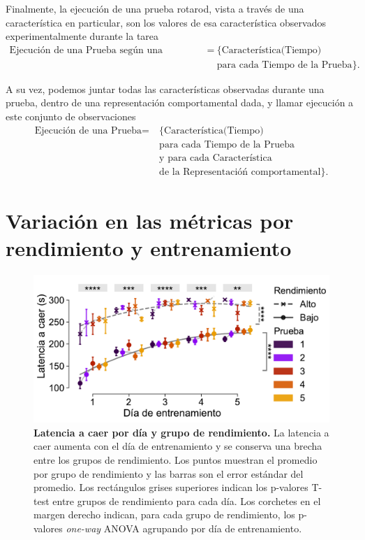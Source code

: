 Finalmente, la ejecución de una prueba rotarod, vista a través de una característica en particular, son los valores de esa característica observados experimentalmente durante la tarea
\begin{align*}
    \text{Ejecución de una Prueba según una Característica} = & \ \{ \text{Característica(Tiempo)}         \\
                                                              & \ \text{para cada Tiempo de la Prueba} \}.
\end{align*}

A su vez, podemos juntar todas las características observadas durante una prueba, dentro de una representación comportamental dada, y llamar ejecución a este conjunto de observaciones
\begin{align*}
    \text{Ejecución de una Prueba} = & \ \{ \text{Característica(Tiempo)}               \\
                                     & \ \text{para cada Tiempo de la Prueba}           \\
                                     & \ \text{y para cada Característica}              \\
                                     & \ \text{de la Representacióń comportamental} \}.
\end{align*}

\clearpage

\section{Variación en las métricas por rendimiento y entrenamiento}\label{sec:variacion_metricas_grupo_rendimiento_dia_entrenamiento}

\begin{figure}[htbp]
    \centering
    \includegraphics[width=0.8\linewidth]{figuras/capitulo3/latencia_por_prueba_por_rendimiento.pdf}
    \caption{\textbf{Latencia a caer por día y grupo de rendimiento.} La latencia a caer aumenta con el día de entrenamiento y se conserva una brecha entre los grupos de rendimiento.
        Los puntos muestran el promedio por grupo de rendimiento y las barras son el error estándar del promedio.
        Los rectángulos grises superiores indican los p-valores T-test entre grupos de rendimiento para cada día.
        Los corchetes en el margen derecho indican, para cada grupo de rendimiento, los p-valores \textit{one-way} ANOVA agrupando por día de entrenamiento.}
    \label{fig:capitulo3_latencia_por_prueba_por_rendimiento}
\end{figure}

